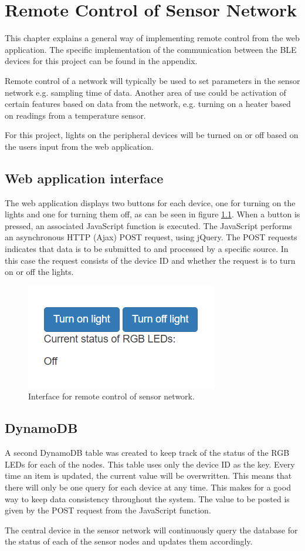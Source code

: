 \chapter{Remote Control of Sensor Network}
This chapter explains a general way of implementing remote control from the web application. The specific implementation of the communication between the BLE devices for this project can be found in the appendix. 

Remote control of a network will typically be used to set parameters in the sensor network e.g. sampling time of data. Another area of use could be activation of certain features based on data from the network, e.g. turning on a heater based on readings from a temperature sensor. 

For this project, lights on the peripheral devices will be turned on or off based on the users input from the web application.

\section{Web application interface}
The web application displays two buttons for each device, one for turning on the lights and one for turning them off, as can be seen in figure \ref{fig:remote}. When a button is pressed, an associated JavaScript function is executed. The JavaScript performs an asynchronous HTTP (Ajax) POST request, using jQuery. The POST requests indicates that data is to be submitted to and processed by a specific source. In this case the request consists of the device ID and whether the request is to turn on or off the lights. 

\begin{figure}[ht]
    \centering
    \includegraphics[scale=1]{Figures/remote_control.png}
    \caption{Interface for remote control of sensor network.}
    \label{fig:remote}
\end{figure}

\section{DynamoDB}
A second DynamoDB table was created to keep track of the status of the RGB LEDs for each of the nodes. This table uses only the device ID as the key. Every time an item is updated, the current value will be overwritten. This means that there will only be one query for each device at any time. This makes for a good way to keep data consistency throughout the system. The value to be posted is given by the POST request from the JavaScript function. 

The central device in the sensor network will continuously query the database for the status of each of the sensor nodes and updates them accordingly.  